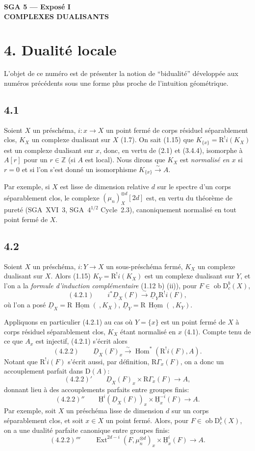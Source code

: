 \documentclass[11pt]{article}
\providecommand{\uH}{\underline{\mathrm H}}
\DeclareMathOperator{\Hom}{Hom}
\DeclareMathOperator{\Ext}{Ext}
\newcommand{\R}{\mathrm{R}}
\newcommand{\D}{\mathrm{D}}
\newcommand{\Z}{\mathbb{Z}}
\newcommand{\ob}{\operatorname{ob}}
\begin{document}
\begin{center}{\Large \textbf{SGA 5 --- Exposé I}}\\{\large \textbf{COMPLEXES DUALISANTS}}\end{center}


\section*{4. Dualité locale}

L'objet de ce numéro est de présenter la notion de ``bidualité'' développée aux numéros précédents sous une forme plus proche de l'intuition géométrique.

\subsection*{4.1}
Soient $X$ un préschéma, $i:x\to X$ un point fermé de corps résiduel séparablement clos, $K_X$ un complexe dualisant sur $X$ (1.7). On sait (1.15) que $K_{\{x\}}=\R^{!}i(K_X)$ est un complexe dualisant sur $x$, donc, en vertu de (2.1) et (3.4.4), isomorphe à $A[r]$ pour un $r\in\Z$ (si $A$ est local). Nous dirons que $K_X$ est \emph{normalisé en $x$} si $r=0$ et si l'on s'est donné un isomorphisme $K_{\{x\}}\xrightarrow{\sim}A$.

Par exemple, si $X$ est lisse de dimension relative $d$ sur le spectre d'un corps séparablement clos, le complexe $(\mu_n)_X^{\otimes d}[2d]$ est, en vertu du théorème de pureté (SGA~XVI~3, SGA~$4^{1/2}$ Cycle~2.3), canoniquement normalisé en tout point fermé de $X$.

\subsection*{4.2}
Soient $X$ un préschéma, $i:Y\to X$ un sous-préschéma fermé, $K_X$ un complexe dualisant sur $X$. Alors (1.15) $K_Y=\R^{!}i(K_X)$ est un complexe dualisant sur $Y$, et l'on a la \emph{formule d'induction complémentaire} (1.12 b) (ii)), pour $F\in \ob\D_c^b(X)$,
\[
(4.2.1)\qquad i^*\underline{D}_X(F)\xrightarrow{\sim}\underline{D}_Y\R^{!}i(F),
\]
où l'on a posé $\underline{D}_X=\R\,\underline{\Hom}(\ ,K_X)$, $\underline{D}_Y=\R\,\underline{\Hom}(\ ,K_Y)$.

Appliquons en particulier (4.2.1) au cas où $Y=\{x\}$ est un point fermé de $X$ à corps résiduel séparablement clos, $K_X$ étant normalisé en $x$ (4.1). Compte tenu de ce que $A_x$ est injectif, (4.2.1) s'écrit alors
\[
(4.2.2)\qquad \underline{D}_X(F)_x\xrightarrow{\sim}\Hom^*(\R^{!}i(F),A).
\]
Notant que $\R^{!}i(F)$ s'écrit aussi, par définition, $\R\Gamma_x(F)$, on a donc un accouplement parfait dans $\D(A)$:
\[
(4.2.2)'\qquad \underline{D}_X(F)_x\times \R\Gamma_x(F)\longrightarrow A,
\]
donnant lieu à des accouplements parfaits entre groupes finis:
\[
(4.2.2)''\qquad \uH^i(\underline{D}_X(F))_x\times \uH_x^{-i}(F)\longrightarrow A.
\]
Par exemple, soit $X$ un préschéma lisse de dimension $d$ sur un corps séparablement clos, et soit $x\in X$ un point fermé. Alors, pour $F\in\ob\D_c^b(X)$, on a une dualité parfaite canonique entre groupes finis:
\[
(4.2.2)'''\qquad \Ext^{2d-i}(F,\mu_n^{\otimes d})_x\times \uH_x^i(F)\longrightarrow A.
\]
\end{document}
